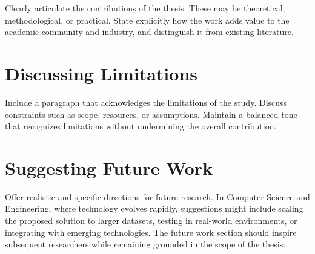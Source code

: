Clearly articulate the contributions of the thesis. These may be theoretical, methodological, or practical. State explicitly how the work adds value to the academic community and industry, and distinguish it from existing literature.

\section{Discussing Limitations}
\label{sec:discussing-limitations}

Include a paragraph that acknowledges the limitations of the study. Discuss constraints such as scope, resources, or assumptions. Maintain a balanced tone that recognizes limitations without undermining the overall contribution.

\section{Suggesting Future Work}
\label{sec:suggesting-future-work}

Offer realistic and specific directions for future research. In Computer Science and Engineering, where technology evolves rapidly, suggestions might include scaling the proposed solution to larger datasets, testing in real-world environments, or integrating with emerging technologies. The future work section should inspire subsequent researchers while remaining grounded in the scope of the thesis.
